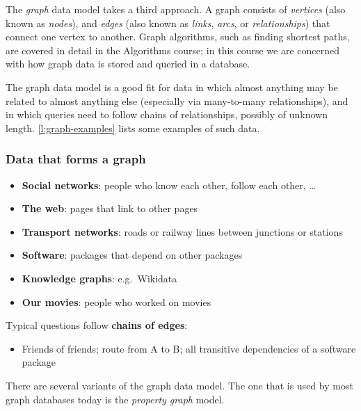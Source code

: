 The \emph{graph} data model takes a third approach.
A graph consists of \emph{vertices} (also known as \emph{nodes}), and \emph{edges} (also known as \emph{links}, \emph{arcs}, or \emph{relationships}) that connect one vertex to another.
Graph algorithms, such as finding shortest paths, are covered in detail in the Algorithms course; in this course we are concerned with how graph data is stored and queried in a database.

The graph data model is a good fit for data in which almost anything may be related to almost anything else (especially via many-to-many relationships), and in which queries need to follow chains of relationships, possibly of unknown length.
\autoref{l:graph-examples} lists some examples of such data.

\begin{frame}
    \label{s:graph-examples}
    \frametitle{Data that forms a graph}
    \begin{itemize}
        \item \textbf{Social networks}: people who know each other, follow each other, \dots
        \item \textbf{The web}: pages that link to other pages
        \item \textbf{Transport networks}: roads or railway lines between junctions or stations
        \item \textbf{Software}: packages that depend on other packages
        \item \textbf{Knowledge graphs}: e.g.\ Wikidata
        \item \textbf{Our movies}: people who worked on movies\\[1em]\pause
    \end{itemize}
    Typical questions follow \textbf{chains of edges}:
    \begin{itemize}
        \item Friends of friends; route from A to B; all transitive dependencies of a software package
    \end{itemize}
\end{frame}
\label{l:graph-examples}

There are several variants of the graph data model.
The one that is used by most graph databases today is the \emph{property graph} model.

